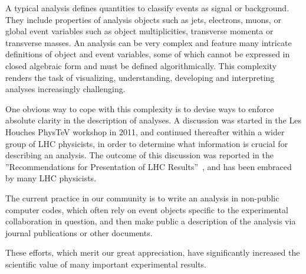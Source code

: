 \documentclass[11pt]{cernrep}
\begin{document}
A typical analysis defines quantities to classify events as signal
or background. They include properties of analysis objects such as
jets, electrons, muons, or global event variables such as object multiplicities,
transverse momenta or transverse masses.
An analysis can be very complex and feature many intricate definitions of object and event
variables, some of which cannot be expressed in closed algebraic form and must be defined
algorithmically. This complexity renders the task of visualizing, understanding, developing and
interpreting analyses increasingly challenging.

One obvious way to cope with this complexity is to devise ways to enforce absolute clarity in the description of analyses.
A discussion was started in the Les Houches PhysTeV workshop in 2011, and continued
thereafter within a wider group of LHC physicists, in order to determine what information is
crucial for describing an analysis. The outcome of this discussion was reported in the
''Recommendations for Presentation of LHC Results''~\cite{Brooijmans:2012yi,Kraml:2012sg,Brooijmans:2016vro}, and has been embraced by many LHC physicists.

The current practice in our community is to write an analysis in non-public computer codes,
which often rely on event objects specific to the experimental collaboration in question,
and then make public a description of the analysis via journal publications or other documents.

These efforts, which merit our great appreciation,
have significantly increased the scientific value of many important experimental results.
\end{document}
